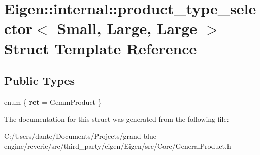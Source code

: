 \hypertarget{struct_eigen_1_1internal_1_1product__type__selector_3_01_small_00_01_large_00_01_large_01_4}{}\section{Eigen\+::internal\+::product\+\_\+type\+\_\+selector$<$ Small, Large, Large $>$ Struct Template Reference}
\label{struct_eigen_1_1internal_1_1product__type__selector_3_01_small_00_01_large_00_01_large_01_4}
\subsection*{Public Types}
\begin{DoxyCompactItemize}
\item 
\mbox{\label{struct_eigen_1_1internal_1_1product__type__selector_3_01_small_00_01_large_00_01_large_01_4_ad0fed7b8328cf99d8e6b104b756000da}} 
enum \{ {\bfseries ret} = Gemm\+Product
 \}
\end{DoxyCompactItemize}


The documentation for this struct was generated from the following file\+:\begin{DoxyCompactItemize}
\item 
C\+:/\+Users/dante/\+Documents/\+Projects/grand-\/blue-\/engine/reverie/src/third\+\_\+party/eigen/\+Eigen/src/\+Core/General\+Product.\+h\end{DoxyCompactItemize}
